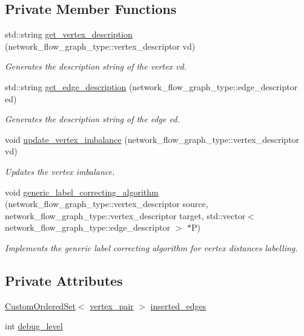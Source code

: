 \subsection*{Private Member Functions}
\begin{DoxyCompactItemize}
\item 
std\+::string \hyperlink{classnetwork__flow_aab892c67c8c4cc7049425026abb761d3}{get\+\_\+vertex\+\_\+description} (network\+\_\+flow\+\_\+graph\+\_\+type\+::vertex\+\_\+descriptor vd)
\begin{DoxyCompactList}\small\item\em Generates the description string of the vertex vd. \end{DoxyCompactList}\item 
std\+::string \hyperlink{classnetwork__flow_aa2eff0f34c5f856ec9541fcc967dccce}{get\+\_\+edge\+\_\+description} (network\+\_\+flow\+\_\+graph\+\_\+type\+::edge\+\_\+descriptor ed)
\begin{DoxyCompactList}\small\item\em Generates the description string of the edge ed. \end{DoxyCompactList}\item 
void \hyperlink{classnetwork__flow_a7ed1ac1a83151c5af0026a72b84405bb}{update\+\_\+vertex\+\_\+imbalance} (network\+\_\+flow\+\_\+graph\+\_\+type\+::vertex\+\_\+descriptor vd)
\begin{DoxyCompactList}\small\item\em Updates the vertex imbalance. \end{DoxyCompactList}\item 
void \hyperlink{classnetwork__flow_ae929e866017b89fc52422de8e041d8f4}{generic\+\_\+label\+\_\+correcting\+\_\+algorithm} (network\+\_\+flow\+\_\+graph\+\_\+type\+::vertex\+\_\+descriptor source, network\+\_\+flow\+\_\+graph\+\_\+type\+::vertex\+\_\+descriptor target, std\+::vector$<$ network\+\_\+flow\+\_\+graph\+\_\+type\+::edge\+\_\+descriptor $>$ $\ast$P)
\begin{DoxyCompactList}\small\item\em Implements the generic label correcting algorithm for vertex distances labelling. \end{DoxyCompactList}\end{DoxyCompactItemize}
\subsection*{Private Attributes}
\begin{DoxyCompactItemize}
\item 
\hyperlink{classCustomOrderedSet}{Custom\+Ordered\+Set}$<$ \hyperlink{classnetwork__flow_a7a59f52da10f126268707c9097a37442}{vertex\+\_\+pair} $>$ \hyperlink{classnetwork__flow_a27d1ff9debb67be0cd37cb160e83e663}{inserted\+\_\+edges}
\item 
int \hyperlink{classnetwork__flow_ac31f2a0cbbafcf5ac5f0d415952f8817}{debug\+\_\+level}
\end{DoxyCompactItemize}



